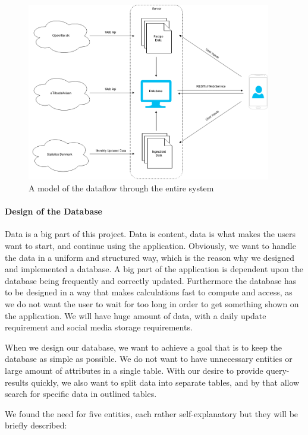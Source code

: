 \begin{figure}
\centering
\includegraphics[width=0.95\textwidth]{Pictures/dataflow}
\caption{A model of the dataflow through the entire system}
\label{fig:backend_dataflow}
\end{figure}

\paragraph{Design of the Database}
\label{para:dbdesign}

Data is a big part of this project. Data is content, data is what makes the users want to start, and continue using the application. Obviously, we want to handle the data in a uniform and structured way, which is the reason why we designed and implemented a database. A big part of the application is dependent upon the database being frequently and correctly updated. Furthermore the database has to be designed in a way that makes calculations fast to compute and access, as we do not want the user to wait for too long in order to get something shown on the application. We will have huge amount of data, with a daily update requirement and social media storage requirements.

When we design our database, we want to achieve a goal that is to keep the database as simple as possible. We do not want to have unnecessary entities or large amount of attributes in a single table. With our desire to provide query-results quickly, we also want to split data into separate tables, and by that allow search for specific data in outlined tables. 

We found the need for five entities, each rather self-explanatory but they will be briefly described:

